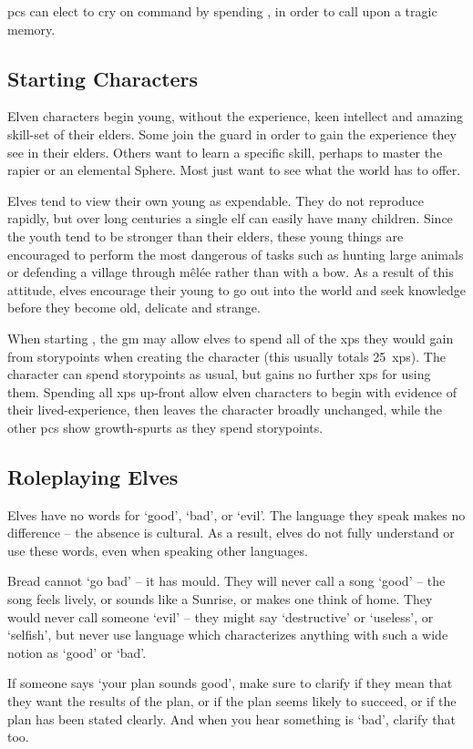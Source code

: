 \Glspl{pc} can elect to cry on command by spending , in order to call upon a tragic memory.

\subsection{Starting Characters}
Elven characters begin young, without the experience, keen intellect and amazing skill-set of their elders.
Some join the \gls{guard} in order to gain the experience they see in their elders.
Others want to learn a specific skill, perhaps to master the rapier or an elemental Sphere.
Most just want to see what the world has to offer.

Elves tend to view their own young as expendable.
They do not reproduce rapidly, but over long centuries a single elf can easily have many children.
Since the youth tend to be stronger than their elders, these young things are encouraged to perform the most dangerous of tasks such as hunting large animals or defending a village through m\^{e}l\'{e}e rather than with a bow.
As a result of this attitude, elves encourage their young to go out into the world and seek knowledge before they become old, delicate and strange.

When starting , the \gls{gm} may allow elves to spend all of the \glspl{xp} they would gain from \glspl{storypoint} when creating the character (this usually totals 25~\glspl{xp}).
The character can spend \glspl{storypoint} as usual, but gains no further \glspl{xp} for using them.
Spending all \glspl{xp} up-front allow elven characters to begin with evidence of their lived-experience, then leaves the character broadly unchanged, while the other \glspl{pc} show growth-spurts as they spend \glspl{storypoint}.

\subsection{Roleplaying Elves}
\label{elfRoleplaying}

Elves have no words for `good', `bad', or `evil'.
The language they speak makes no difference -- the absence is cultural.
As a result, elves do not fully understand or use these words, even when speaking other languages.

Bread cannot `go bad' -- it has mould.
They will never call a song `good' -- the song feels lively, or sounds like a Sunrise, or makes one think of home.
They would never call someone `evil' -- they might say `destructive' or `useless', or `selfish', but never use language which characterizes anything with such a wide notion as `good' or `bad'.

If someone says `your plan sounds good', make sure to clarify if they mean that they want the results of the plan, or if the plan seems likely to succeed, or if the plan has been stated clearly.
And when you hear something is `bad', clarify that too.


